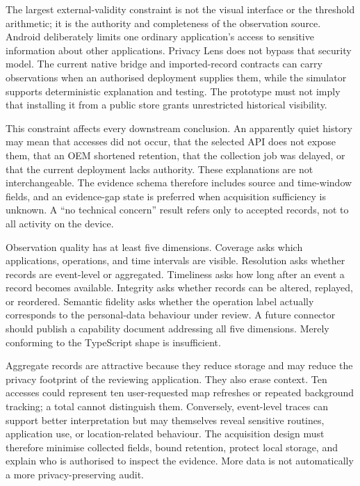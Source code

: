 The largest external-validity constraint is not the visual interface or the threshold arithmetic; it is the authority and completeness of the observation source. Android deliberately limits one ordinary application's access to sensitive information about other applications. Privacy Lens does not bypass that security model. The current native bridge and imported-record contracts can carry observations when an authorised deployment supplies them, while the simulator supports deterministic explanation and testing. The prototype must not imply that installing it from a public store grants unrestricted historical visibility.

This constraint affects every downstream conclusion. An apparently quiet history may mean that accesses did not occur, that the selected API does not expose them, that an OEM shortened retention, that the collection job was delayed, or that the current deployment lacks authority. These explanations are not interchangeable. The evidence schema therefore includes source and time-window fields, and an evidence-gap state is preferred when acquisition sufficiency is unknown. A ``no technical concern'' result refers only to accepted records, not to all activity on the device.

Observation quality has at least five dimensions. Coverage asks which applications, operations, and time intervals are visible. Resolution asks whether records are event-level or aggregated. Timeliness asks how long after an event a record becomes available. Integrity asks whether records can be altered, replayed, or reordered. Semantic fidelity asks whether the operation label actually corresponds to the personal-data behaviour under review. A future connector should publish a capability document addressing all five dimensions. Merely conforming to the TypeScript shape is insufficient.

Aggregate records are attractive because they reduce storage and may reduce the privacy footprint of the reviewing application. They also erase context. Ten accesses could represent ten user-requested map refreshes or repeated background tracking; a total cannot distinguish them. Conversely, event-level traces can support better interpretation but may themselves reveal sensitive routines, application use, or location-related behaviour. The acquisition design must therefore minimise collected fields, bound retention, protect local storage, and explain who is authorised to inspect the evidence. More data is not automatically a more privacy-preserving audit.

